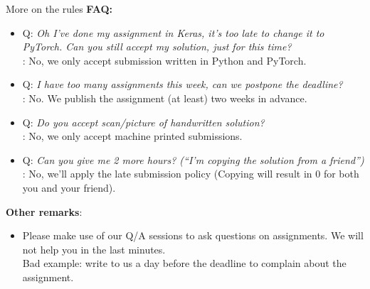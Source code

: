 \begin{frame}{More on the rules}
\textbf{FAQ:}
\begin{itemize}
\item Q: \textit{Oh I've done my assignment in Keras, it's too late to change it to PyTorch. Can you still accept my solution, just for this time?}\\
: No, we only accept submission written in Python and PyTorch.
\pause
\item Q: \textit{I have too many assignments this week, can we postpone the deadline?}\\
: No. We publish the assignment (at least) two weeks in advance.
\pause
\item Q: \textit{Do you accept scan/picture of handwritten solution?}\\
: No, we only accept machine printed submissions. \\
\pause
\item Q: \textit{Can you give me 2 more hours? (``I'm copying the solution from a friend'')}\\
: No, we'll apply the late submission policy (Copying will result in 0 for both you and your friend). \\
\end{itemize}
\vsp
\pause
\textbf{Other remarks}:
\begin{itemize}
\item Please make use of our Q/A sessions to ask questions on assignments.
We will not help you in the last minutes.\\
Bad example: write to us a day before the deadline to complain about the assignment.
\end{itemize}
\end{frame}


